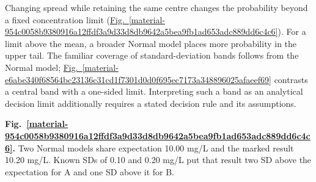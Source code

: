 \documentclass[11pt,a4paper]{article}
\begin{document}
Changing spread while retaining the same centre changes the probability beyond a fixed concentration limit (\hyperref[material-954c0058b9380916a12ffdf3a9d33d8db9642a5bea9fb1ad653adc889dd6c4c6]{Fig.~\ref*{material-954c0058b9380916a12ffdf3a9d33d8db9642a5bea9fb1ad653adc889dd6c4c6}}). For a limit above the mean, a broader Normal model places more probability in the upper tail. The familiar coverage of standard-deviation bands follows from the Normal model; \hyperref[material-e6abe340f68564bc23136c31cd1f7301d0d0f695ec7173a348896025afaeef69]{Fig.~\ref*{material-e6abe340f68564bc23136c31cd1f7301d0d0f695ec7173a348896025afaeef69}} contrasts a central band with a one-sided limit. Interpreting such a band as an analytical decision limit additionally requires a stated decision rule and its assumptions.


\par\medskip
\Needspace{10cm}
\label{material-954c0058b9380916a12ffdf3a9d33d8db9642a5bea9fb1ad653adc889dd6c4c6}
\noindent\textbf{Fig.~\ref*{material-954c0058b9380916a12ffdf3a9d33d8db9642a5bea9fb1ad653adc889dd6c4c6}.} Two Normal models share expectation 10.00 mg/L and the marked result 10.20 mg/L. Known SDs of 0.10 and 0.20 mg/L put that result two SD above the expectation for A and one SD above it for B.\par\nopagebreak
\end{document}
